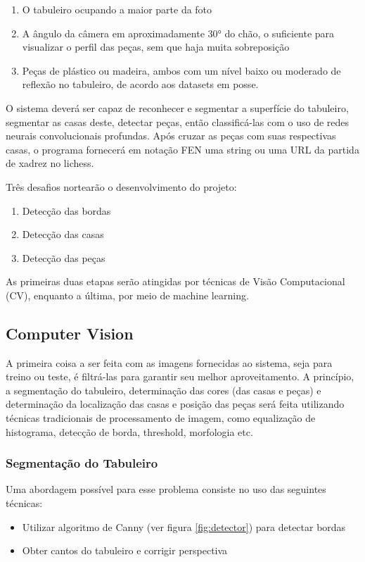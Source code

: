 \documentclass[a4paper,12pt,twoside]{article}
\begin{document}
\begin{enumerate}
    \item{O tabuleiro ocupando a maior parte da foto}
    \item{A ângulo da câmera em aproximadamente 30° do chão,
          o suficiente para visualizar o perfil das peças, sem que haja muita sobreposição}
    \item{Peças de plástico ou madeira, ambos com um nível baixo ou moderado de reflexão no tabuleiro,
          de acordo aos datasets em posse.}
\end{enumerate}

O sistema deverá ser capaz de reconhecer e segmentar a superfície do tabuleiro,
segmentar as casas deste, detectar peças,
então classificá-las com o uso de redes neurais convolucionais profundas.
Após cruzar as peças com suas respectivas casas,
o programa fornecerá em notação FEN uma string ou uma URL da partida de xadrez no lichess.

Três desafios nortearão o desenvolvimento do projeto:

\begin{enumerate}
    \item{Detecção das bordas}
    \item{Detecção das casas}
    \item{Detecção das peças}
\end{enumerate}

As primeiras duas etapas serão atingidas por técnicas de Visão Computacional (CV),
enquanto a última, por meio de machine learning.

\subsection{Computer Vision}

A primeira coisa a ser feita com as imagens fornecidas ao sistema,
seja para treino ou teste, é filtrá-las para garantir seu melhor aproveitamento.
A princípio, a segmentação do tabuleiro,
determinação das cores (das casas e peças) e determinação da localização das casas e posição das peças
será feita utilizando técnicas tradicionais de processamento de imagem,
como equalização de histograma, detecção de borda, threshold, morfologia etc.

\subsubsection{Segmentação do Tabuleiro}
Uma abordagem possível para esse problema consiste no uso das seguintes técnicas:
\begin{itemize}
    \item{Utilizar algoritmo de Canny (ver figura \ref{fig:detector}) para detectar bordas}
    \item{Obter cantos do tabuleiro e corrigir perspectiva}
\end{itemize}
\end{document}
